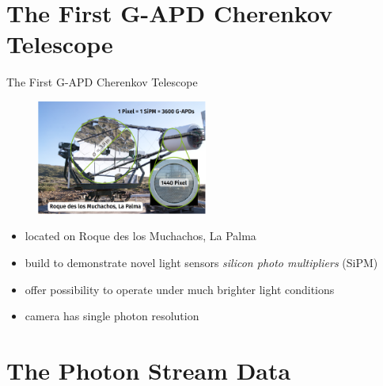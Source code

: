 



\maketitle

\section{The First G-APD Cherenkov Telescope}

\begin{frame}[t]{The First G-APD Cherenkov Telescope}
  \begin{multicols}{2}
    \vspace*{\fill}
    \begin{figure}
        \centering
        \includegraphics[width=0.5\textwidth]{fig/fact.png}
    \end{figure}
    \columnbreak
    \vspace*{\fill}
      \begin{itemize}
        \item located on Roque des los Muchachos, La Palma
        \item build to demonstrate novel light sensors \textit{silicon photo multipliers} (SiPM)
        \item offer possibility to operate under much brighter light conditions
        \item camera has single photon resolution
    \end{itemize}
    \vspace*{\fill}
  \end{multicols}
\end{frame}

\section{The Photon Stream Data}

